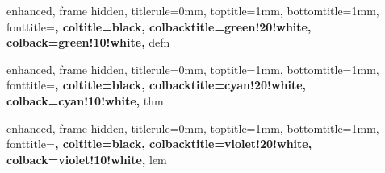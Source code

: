 
{
    enhanced,
    frame hidden,
    titlerule=0mm,
    toptitle=1mm,
    bottomtitle=1mm,
    fonttitle=\bfseries\large,
    coltitle=black,
    colbacktitle=green!20!white,
    colback=green!10!white,
}{defn}



{
    enhanced,
    frame hidden,
    titlerule=0mm,
    toptitle=1mm,
    bottomtitle=1mm,
    fonttitle=\bfseries\large,
    coltitle=black,
    colbacktitle=cyan!20!white,
    colback=cyan!10!white,
}{thm}



{
    enhanced,
    frame hidden,
    titlerule=0mm,
    toptitle=1mm,
    bottomtitle=1mm,
    fonttitle=\bfseries\large,
    coltitle=black,
    colbacktitle=violet!20!white,
    colback=violet!10!white,
}{lem}


